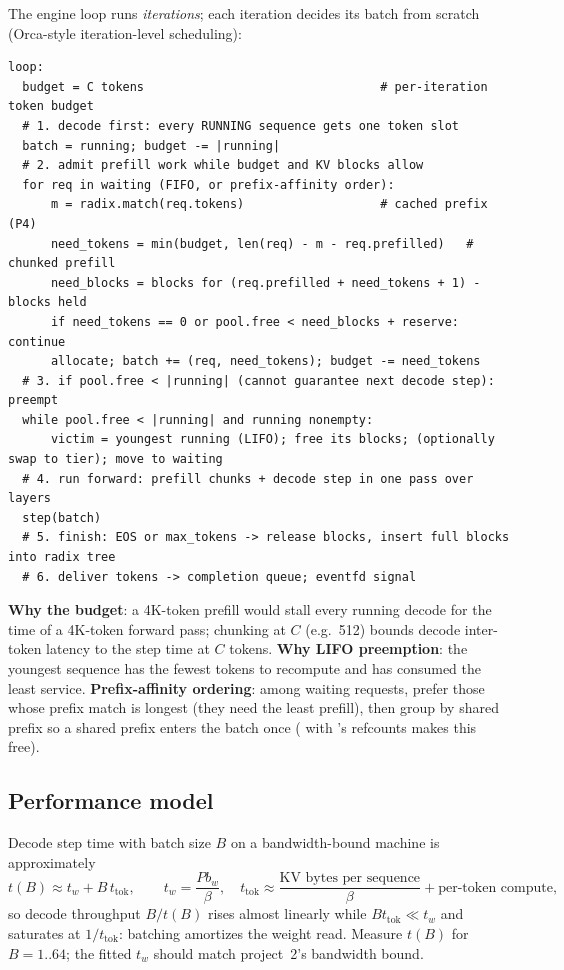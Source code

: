 The engine loop runs \emph{iterations}; each iteration decides its batch from scratch (Orca-style iteration-level scheduling):
\begin{lstlisting}[style=plain]
loop:
  budget = C tokens                                 # per-iteration token budget
  # 1. decode first: every RUNNING sequence gets one token slot
  batch = running; budget -= |running|
  # 2. admit prefill work while budget and KV blocks allow
  for req in waiting (FIFO, or prefix-affinity order):
      m = radix.match(req.tokens)                   # cached prefix (P4)
      need_tokens = min(budget, len(req) - m - req.prefilled)   # chunked prefill
      need_blocks = blocks for (req.prefilled + need_tokens + 1) - blocks held
      if need_tokens == 0 or pool.free < need_blocks + reserve: continue
      allocate; batch += (req, need_tokens); budget -= need_tokens
  # 3. if pool.free < |running| (cannot guarantee next decode step): preempt
  while pool.free < |running| and running nonempty:
      victim = youngest running (LIFO); free its blocks; (optionally swap to tier); move to waiting
  # 4. run forward: prefill chunks + decode step in one pass over layers
  step(batch)
  # 5. finish: EOS or max_tokens -> release blocks, insert full blocks into radix tree
  # 6. deliver tokens -> completion queue; eventfd signal
\end{lstlisting}
\textbf{Why the budget}: a 4K-token prefill would stall every running decode for the time of a 4K-token forward pass; chunking at $C$ (e.g.\ 512) bounds decode inter-token latency to the step time at $C$ tokens. \textbf{Why LIFO preemption}: the youngest sequence has the fewest tokens to recompute and has consumed the least service. \textbf{Prefix-affinity ordering}: among waiting requests, prefer those whose prefix match is longest (they need the least prefill), then group by shared prefix so a shared prefix enters the batch once ( with 's refcounts makes this free).

\subsection{Performance model}

Decode step time with batch size $B$ on a bandwidth-bound machine is approximately
\begin{equation}
t(B) \approx t_w + B\,t_{\text{tok}},\qquad t_w = \frac{P b_w}{\beta},\quad t_{\text{tok}} \approx \frac{\text{KV bytes per sequence}}{\beta} + \text{per-token compute},
\end{equation}
so decode throughput $B/t(B)$ rises almost linearly while $B t_{\text{tok}} \ll t_w$ and saturates at $1/t_{\text{tok}}$: batching amortizes the weight read. Measure $t(B)$ for $B = 1..64$; the fitted $t_w$ should match project~2's bandwidth bound.

